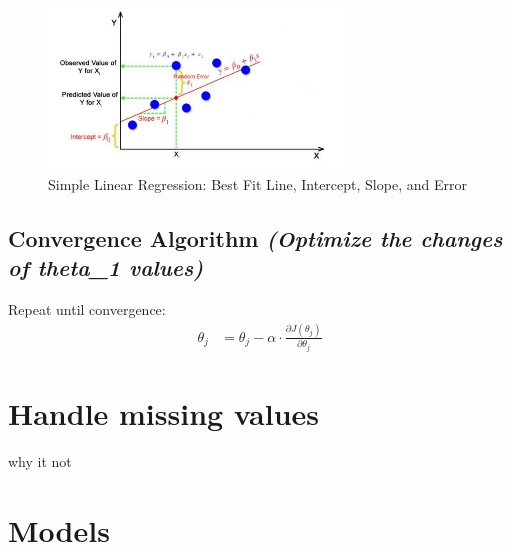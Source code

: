 \documentclass{article}
\begin{document}
\begin{figure}[h!]
    \centering
    \includegraphics[width=0.7\textwidth]{best_fit.png} %
    \caption{Simple Linear Regression: Best Fit Line, Intercept, Slope, and Error}
    \label{fig:linear_regression}
\end{figure}
\vspace{1cm} %

\subsection{Convergence Algorithm \textit{(Optimize the changes of theta\_1 values)}}
Repeat until convergence:
\begin{align*}  
    \theta_j &= \theta_j - \alpha \cdot \frac{\partial J(\theta_j)}{\partial \theta_j} 
\end{align*}

\section{Handle missing values}
why it not

\newpage


\section{Models}
\end{document}
